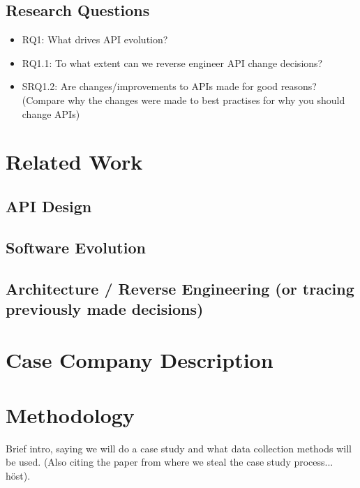 \documentclass[10pt,twocolumn]{article}
\begin{document}

\subsection{Research Questions}
\begin{itemize}
\item RQ1: What drives API evolution? 
\item RQ1.1: To what extent can we reverse engineer API change decisions?
\item SRQ1.2: Are changes/improvements to APIs made for good reasons? (Compare why the changes were made to best practises for why you should change APIs)
\end{itemize}


\section{Related Work}

\subsection{API Design}

\subsection{Software Evolution}

\subsection{Architecture / Reverse Engineering (or tracing previously made decisions)}

\section{Case Company Description}



\section{Methodology}
Brief intro, saying we will do a case study and what data collection methods will be used. (Also citing the paper from where we steal the case study process... höst).
\end{document}
